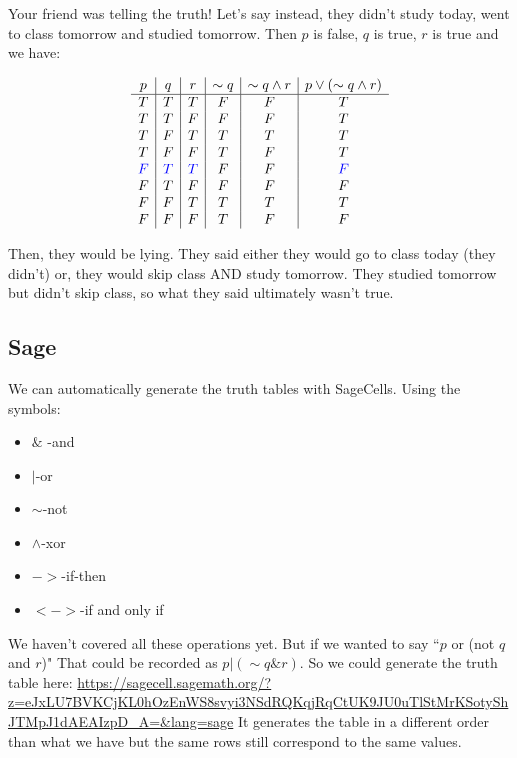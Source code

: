 \documentclass[10pt]{article}
\theoremstyle{definition}
\begin{document}
Your friend was telling the truth!  Let's say instead, they didn't study today, went to class tomorrow and studied tomorrow.  Then $p$ is false, $q$ is true, $r$ is true and we have:

 $$\begin{array}{c|c|c|c|c|c}
p&q&r&\sim q & \sim q \wedge r& p\vee (\sim q \wedge r)\\
\hline
T & T&T&F&F&T\\
T&T&F&F&F&T \\
T&F&T&T&T&T\\
T&F&F&T&F&T\\
\textcolor{blue}F & \textcolor{blue}T&\textcolor{blue}T&F&F&\textcolor{blue}F\\
F&T&F&F&F&F\\
F&F&T&T&T&T\\
F&F&F&T&F&F
\end{array}$$

Then, they would be lying.  They said either they would go to class today (they didn't) or, they would skip class AND study tomorrow.  They studied tomorrow but didn't skip class, so what they said ultimately wasn't true.






\subsection{Sage}

We can automatically generate the truth tables with SageCells.  Using the symbols:

\begin{itemize}
\item    $\&$ -and
\item    $|$-or
\item    $\sim$-not
\item    $\wedge$-xor
 \item   $->$-if-then
\item    $<->$-if and only if
\end{itemize}


We haven't covered all these operations yet.  But if we wanted to say ``$p$ or (not $q$ and $r$)"  That could be recorded as $p|(\sim q\&r)$.  So we could generate the truth table here:  \url{https://sagecell.sagemath.org/?z=eJxLU7BVKCjKL0hOzEnWS8svyi3NSdRQKqjRqCtUK9JU0uTlStMrKSotyShJTMpJ1dAEAIzpD_A=&lang=sage}  It generates the table in a different order than what we have but the same rows still correspond to the same values.
\end{document}
